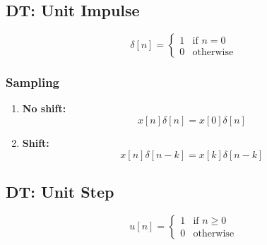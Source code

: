 \subsection{DT: Unit Impulse}
\begin{definition}
    \begin{equation}
        \delta[n] = 
        \begin{cases}
        1 & \text{if } n = 0 \\
        0 & \text{otherwise}
        \end{cases}
    \end{equation}

\end{definition}

    \subsubsection{Sampling}
    \begin{definition}
        \begin{enumerate}
            \item \textbf{No shift:}
            \begin{equation}
                x[n] \delta[n] = x[0] \delta[n]
            \end{equation}
            
            \item \textbf{Shift:}
            \begin{equation}
                x[n] \delta[n-k] = x[k] \delta[n-k]
            \end{equation}
        \end{enumerate}
    \end{definition}

\subsection{DT: Unit Step}
\begin{definition}
    \begin{equation}
        u[n] =
        \begin{cases} 
        1 & \text{if } n \geq 0 \\
        0 & \text{otherwise}
        \end{cases}
    \end{equation}     
    
\end{definition}

